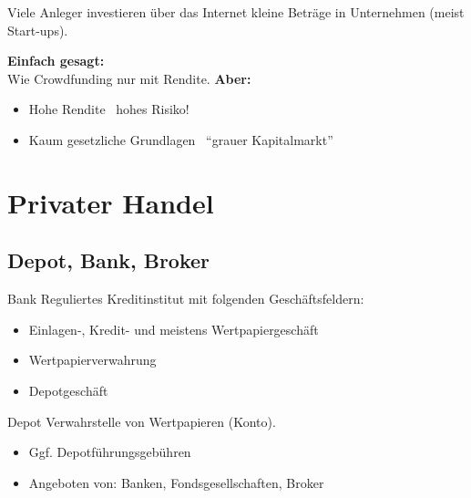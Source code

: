 \documentclass{beamer}
\begin{document}
			\begin{frame}
				\begin{definition}
					Viele Anleger investieren über das Internet kleine Beträge in Unternehmen (meist  Start-ups).
				\end{definition}
				\textbf{Einfach gesagt:}\\
				Wie Crowdfunding nur mit Rendite.\n
				\textbf{Aber:}
				\begin{itemize}
					\item Hohe Rendite \textrightarrow\ hohes Risiko!
					\item Kaum gesetzliche Grundlagen \textrightarrow\ "`grauer Kapitalmarkt"'
				\end{itemize}
			\end{frame}
	
	\section{Privater Handel}
	
		\begin{frame}
		\end{frame}
	
		\subsection{Depot, Bank, Broker}
		
			\begin{frame}{Bank}
				Reguliertes Kreditinstitut mit folgenden Geschäftsfeldern:
				\begin{itemize}
					\item Einlagen-, Kredit- und meistens Wertpapiergeschäft
					\item Wertpapierverwahrung
					\item Depotgeschäft
				\end{itemize}
			\end{frame}
		
			\begin{frame}{Depot}
				Verwahrstelle von Wertpapieren (Konto).
				\begin{itemize}
					\item Ggf. Depotführungsgebühren
					\item Angeboten von: Banken, Fondsgesellschaften, Broker
				\end{itemize}
			\end{frame}
		
\end{document}
